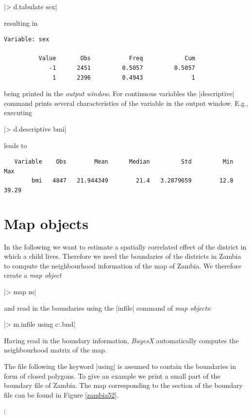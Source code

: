 \documentclass[a4paper]{article}
\begin{document}
|> d.tabulate sex|

resulting in

\begin{verbatim}
Variable: sex

          Value       Obs           Freq            Cum
             -1      2451         0.5057         0.5057
              1      2396         0.4943              1
\end{verbatim}

being printed in the {\it output window}. For continuous variables
the |descriptive| command prints several characteristics of the
variable in the {output window}. E.g., executing

|> d.descriptive bmi|

leads to

\begin{verbatim}
   Variable    Obs        Mean      Median         Std         Min         Max
        bmi   4847   21.944349        21.4   3.2879659        12.8       39.29
\end{verbatim}

\section{Map objects}\label{maps}

In the following we want to estimate a spatially correlated effect
of the district in which a child lives. Therefore we need the
boundaries of the districts in Zambia to compute the neighbourhood
information of the map of Zambia. We therefore create a {\it map
object}

|> map m|

and read in the boundaries using the |infile| command of {\it map
objects}:

|> m.infile using c:\data\zambia.bnd|

Having read in the boundary information, {\it BayesX}
automatically computes the neighbourhood matrix of the map.

The file following the keyword |using| is assumed to contain the
boundaries in form of closed polygons. To give an example we print
a small part of the boundary file of Zambia. The map corresponding
to the section of the boundary file can be found in Figure
\ref{zambia52}.

\footnotesize

\hspace{1cm}  $\vdots$
\end{document}
